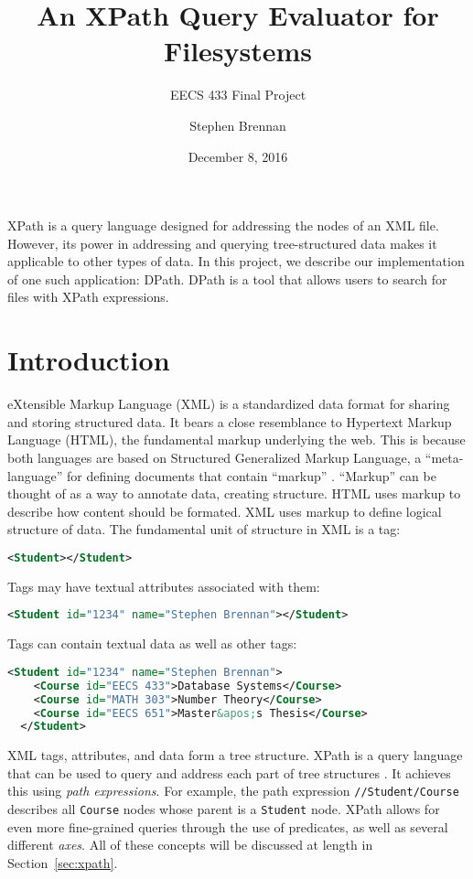 \documentclass{scrartcl}
\title{An XPath Query Evaluator for Filesystems}
\subtitle{EECS 433 Final Project}
\date{December 8, 2016}
\author{Stephen Brennan}
\begin{document}
\maketitle

\abstract

XPath is a query language designed for addressing the nodes of an XML file.
However, its power in addressing and querying tree-structured data makes it
applicable to other types of data. In this project, we describe our
implementation of one such application: DPath. DPath is a tool that allows users
to search for files with XPath expressions.

\section{Introduction}

eXtensible Markup Language (XML) is a standardized data format for sharing and
storing structured data. It bears a close resemblance to Hypertext Markup
Language (HTML), the fundamental markup underlying the web. This is because both
languages are based on Structured Generalized Markup Language, a
``meta-language'' for defining documents that contain ``markup'' \cite{sgml}.
``Markup'' can be thought of as a way to annotate data, creating structure. HTML
uses markup to describe how content should be formated. XML uses markup to
define logical structure of data. The fundamental unit of structure in XML is a
tag:

\begin{lstlisting}[language=XML]
  <Student></Student>
\end{lstlisting}

Tags may have textual attributes associated with them:

\begin{lstlisting}[language=XML]
  <Student id="1234" name="Stephen Brennan"></Student>
\end{lstlisting}

Tags can contain textual data as well as other tags:

\begin{lstlisting}[language=XML]
  <Student id="1234" name="Stephen Brennan">
    <Course id="EECS 433">Database Systems</Course>
    <Course id="MATH 303">Number Theory</Course>
    <Course id="EECS 651">Master&apos;s Thesis</Course>
  </Student>
\end{lstlisting}

XML tags, attributes, and data form a tree structure. XPath is a query language
that can be used to query and address each part of tree structures \cite{xpath}.
It achieves this using \emph{path expressions}. For example, the path expression
\texttt{//Student/Course} describes all \texttt{Course} nodes whose parent is a
\texttt{Student} node. XPath allows for even more fine-grained queries through
the use of predicates, as well as several different \emph{axes}. All of these
concepts will be discussed at length in Section~\ref{sec:xpath}.
\end{document}
